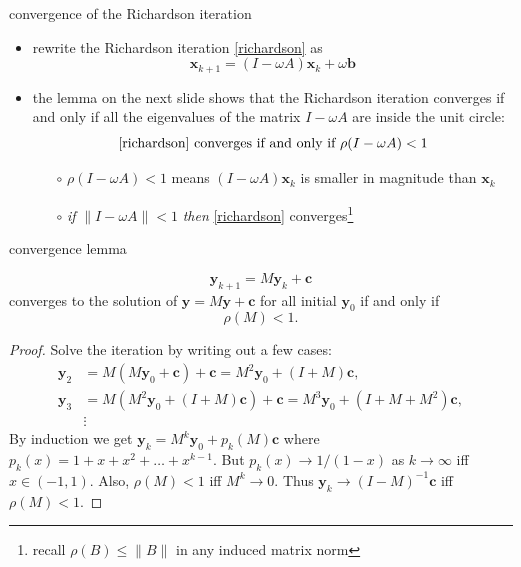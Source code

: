 \documentclass[10pt,hyperref]{beamer}
\newcommand{\bb}{\mathbf{b}}
\newcommand{\bc}{\mathbf{c}}
\newcommand{\bx}{\mathbf{x}}
\newcommand{\by}{\mathbf{y}}
\begin{document}
\begin{frame}{convergence of the Richardson iteration}

\begin{itemize}
\item rewrite the Richardson iteration \eqref{richardson} as
    $$\bx_{k+1} = (I - \omega A) \bx_k + \omega \bb$$
\item the lemma on the next slide shows that the Richardson iteration converges if and only if all the eigenvalues of the matrix $I-\omega A$ are inside the unit circle:
    $$\text{\eqref{richardson} converges if and only if } \rho(I-\omega A) < 1$$
  \begin{itemize}
  \item[$\circ$] $\rho(I-\omega A) < 1$ means $(I - \omega A) \bx_k$ is smaller in magnitude than $\bx_k$
  \item[$\circ$] \emph{if} $\|I-\omega A\| < 1$ \emph{then} \eqref{richardson} converges\footnote{recall $\rho(B) \le \|B\|$ in any induced matrix norm}
  \end{itemize}
\end{itemize}
\end{frame}


\begin{frame}{convergence lemma}

\begin{lemma}
   $$\by_{k+1} = M \by_k + \bc$$
converges to the solution of $\by = M \by + \bc$ for all initial $\by_0$ if and only if
   $$\rho(M) < 1.$$
\end{lemma}

\small
\begin{proof}
Solve the iteration by writing out a few cases:
\begin{align*}
   \by_2 &= M (M \by_0 + \bc) + \bc = M^2 \by_0 + (I + M) \bc, \\
   \by_3 &= M (M^2 \by_0 + (I + M) \bc) + \bc = M^3 \by_0 + (I + M + M^2) \bc, \\
   &\vdots
\end{align*}
By induction we get $\by_k = M^k \by_0 + p_k(M) \bc$ where $p_k(x) = 1 + x + x^2 + \dots + x^{k-1}$.  But $p_k(x) \to 1/(1-x)$ as $k\to\infty$ iff $x\in(-1,1)$.  Also, $\rho(M)<1$ iff $M^k \to 0$.  Thus $\by_k \to (I-M)^{-1} \bc$ iff $\rho(M) < 1$.
\end{proof}
\end{frame}
\end{document}
